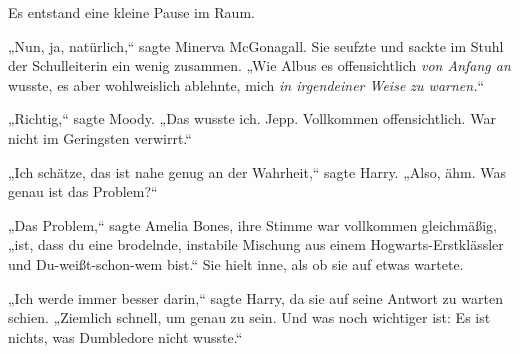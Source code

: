 Es entstand eine kleine Pause im Raum.

„Nun, ja, natürlich,“ sagte Minerva McGonagall.
Sie seufzte und sackte im Stuhl der Schulleiterin ein wenig zusammen.
„Wie Albus es offensichtlich \emph{von Anfang an} wusste, es aber wohlweislich ablehnte, mich \emph{in irgendeiner Weise zu warnen.}“

„Richtig,“ sagte Moody. „Das wusste ich. Jepp. Vollkommen offensichtlich. War nicht im Geringsten verwirrt.“

„Ich schätze, das ist nahe genug an der Wahrheit,“ sagte Harry. „Also, ähm. Was genau ist das Problem?“

„Das Problem,“ sagte Amelia Bones, ihre Stimme war vollkommen gleichmäßig, „ist, dass du eine brodelnde, instabile Mischung aus einem Hogwarts-Erstklässler und Du-weißt-schon-wem bist.“
Sie hielt inne, als ob sie auf etwas wartete.

„Ich werde immer besser darin,“ sagte Harry, da sie auf seine Antwort zu warten schien. „Ziemlich schnell, um genau zu sein. Und was noch wichtiger ist: Es ist nichts, was Dumbledore nicht wusste.“

